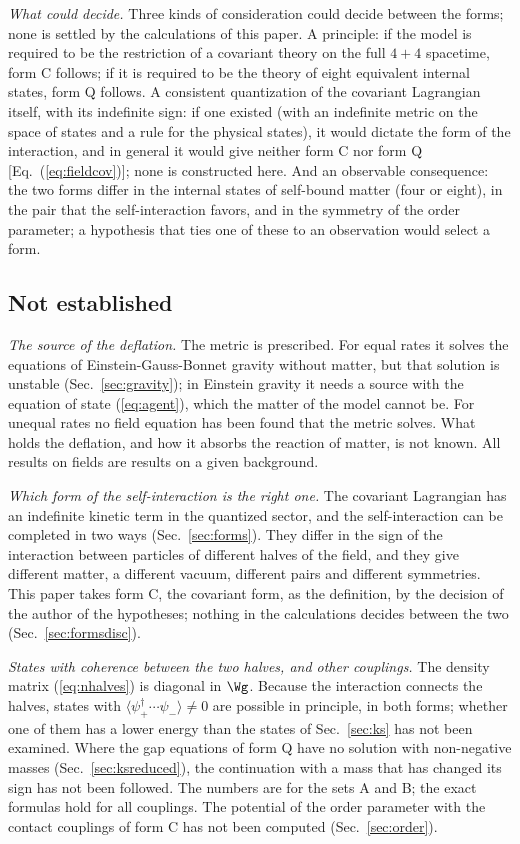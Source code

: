 \emph{What could decide.} Three kinds of consideration could decide between the forms; none is
settled by the calculations of this paper. A principle: if the model is required to be the
restriction of a covariant theory on the full $4+4$ spacetime, form C follows; if it is required to
be the theory of eight equivalent internal states, form Q follows. A consistent quantization of the
covariant Lagrangian itself, with its indefinite sign: if one existed (with an indefinite metric on
the space of states and a rule for the physical states), it would dictate the form of the
interaction, and in general it would give neither form C nor form Q [Eq.~(\ref{eq:fieldcov})]; none
is constructed here. And an observable consequence: the two forms differ in the internal states of
self-bound matter (four or eight), in the pair that the self-interaction favors, and in the symmetry
of the order parameter; a hypothesis that ties one of these to an observation would select a form.

\subsection{Not established}

\emph{The source of the deflation.} The metric is prescribed. For equal rates it solves the
equations of Einstein-Gauss-Bonnet gravity without matter, but that solution is unstable
(Sec.~\ref{sec:gravity}); in Einstein gravity it needs a source with the equation of state
(\ref{eq:agent}), which the matter of the model cannot be. For unequal rates no field equation has
been found that the metric solves. What holds the deflation, and how it absorbs the reaction of
matter, is not known. All results on fields are results on a given background.

\emph{Which form of the self-interaction is the right one.} The covariant Lagrangian has an
indefinite kinetic term in the quantized sector, and the self-interaction can be completed in two
ways (Sec.~\ref{sec:forms}). They differ in the sign of the interaction between particles of
different halves of the field, and they give different matter, a different vacuum, different pairs
and different symmetries. This paper takes form C, the covariant form, as the definition, by the
decision of the author of the hypotheses; nothing in the calculations decides between the two
(Sec.~\ref{sec:formsdisc}).

\emph{States with coherence between the two halves, and other couplings.} The density matrix
(\ref{eq:nhalves}) is diagonal in $\Wg$. Because the interaction connects the halves, states with
$\langle\psi_+^\dagger\cdots\psi_-\rangle\neq0$ are possible in principle, in both forms; whether one
of them has a lower energy than the states of Sec.~\ref{sec:ks} has not been examined. Where the gap
equations of form Q have no solution with non-negative masses (Sec.~\ref{sec:ksreduced}), the
continuation with a mass that has changed its sign has not been followed. The numbers are for the
sets A and B; the exact formulas hold for all couplings. The potential of the order parameter with
the contact couplings of form C has not been computed (Sec.~\ref{sec:order}).


